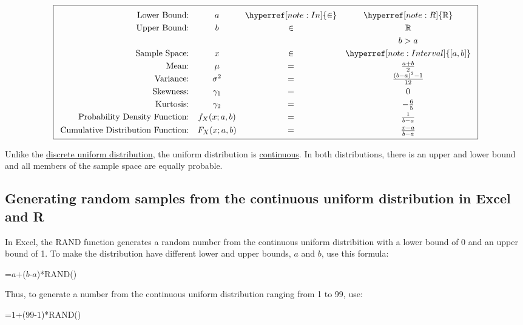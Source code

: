 \documentclass[nohyper,justified,marginals=raggedright]{tufte-book}\usepackage[]{graphicx}\usepackage[]{color}
\begin{document}
\begin{equation*}
\boxed{
\setlength{\extrarowheight}{3pt}
\begin{array}{rccc}
\text{Lower Bound:} & a  & \hyperref [note:In]{\in} &\hyperref [note:R]{\mathbb{R}}\\
\text{Upper Bound:} & b & \in & \mathbb{R}\\
&&&b>a\\
\text{Sample Space:} & x &\in&\hyperref [note:Interval]{\lbrack a,b\rbrack}\\
\text{Mean:} & \mu&=&\frac{a+b}{2} \\
\text{Variance:} & \sigma^2&=&\frac{(b-a)^2-1}{12} \\
\text{Skewness:} & \gamma_1&=&0 \\
\text{Kurtosis:} & \gamma_2&=&-\frac{6}{5} \\
\text{Probability Density Function:} & f_X(x;a,b)&=&\frac{1}{b-a} \\
\text{Cumulative Distribution Function:} & F_X(x;a,b)&=&\frac{x-a}{b-a} \\
\end{array}
}
\end{equation*}

Unlike the \hyperref [sec:DiscreteUniform]{discrete uniform distribution}, the uniform distribution is \hyperref [sec:DiscreteVsContinuous]{continuous}. In both distributions, there is an upper and lower bound and all members of the sample space are equally probable.

\subsection{Generating random samples from the continuous uniform distribution in Excel and R}

In Excel, the \textsf{RAND} function generates a random number from the continuous uniform distribition with a lower bound of 0 and an upper bound of 1. To make the distribution have different lower and upper bounds, $a$ and $b$, use this formula:

\textsf{=$a$+($b$-$a$)*RAND()}

Thus, to generate a number from the continuous uniform distribution ranging from 1 to 99, use:

\textsf{=$1$+($99$-$1$)*RAND()}
\end{document}
